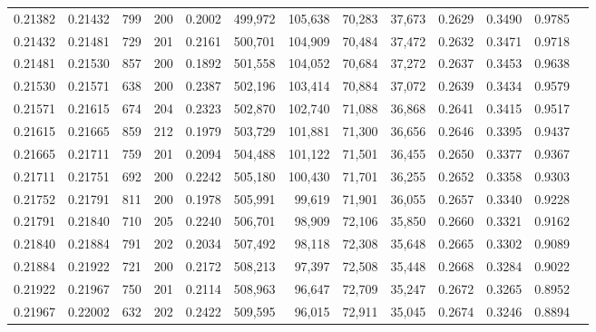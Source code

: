 \begin{tabular}{rrrrrrrrrrrrr}
0.21382 & 0.21432 &   799 & 200 &                                     0.2002 & 499,972 & 105,638 &  70,283 &  37,673 & 0.2629 & 0.3490 & 0.9785 \\
0.21432 & 0.21481 &   729 & 201 &                                     0.2161 & 500,701 & 104,909 &  70,484 &  37,472 & 0.2632 & 0.3471 & 0.9718 \\
0.21481 & 0.21530 &   857 & 200 &                                     0.1892 & 501,558 & 104,052 &  70,684 &  37,272 & 0.2637 & 0.3453 & 0.9638 \\
0.21530 & 0.21571 &   638 & 200 &                                     0.2387 & 502,196 & 103,414 &  70,884 &  37,072 & 0.2639 & 0.3434 & 0.9579 \\
0.21571 & 0.21615 &   674 & 204 &                                     0.2323 & 502,870 & 102,740 &  71,088 &  36,868 & 0.2641 & 0.3415 & 0.9517 \\
0.21615 & 0.21665 &   859 & 212 &                                     0.1979 & 503,729 & 101,881 &  71,300 &  36,656 & 0.2646 & 0.3395 & 0.9437 \\
0.21665 & 0.21711 &   759 & 201 &                                     0.2094 & 504,488 & 101,122 &  71,501 &  36,455 & 0.2650 & 0.3377 & 0.9367 \\
0.21711 & 0.21751 &   692 & 200 &                                     0.2242 & 505,180 & 100,430 &  71,701 &  36,255 & 0.2652 & 0.3358 & 0.9303 \\
0.21752 & 0.21791 &   811 & 200 &                                     0.1978 & 505,991 &  99,619 &  71,901 &  36,055 & 0.2657 & 0.3340 & 0.9228 \\
0.21791 & 0.21840 &   710 & 205 &                                     0.2240 & 506,701 &  98,909 &  72,106 &  35,850 & 0.2660 & 0.3321 & 0.9162 \\
0.21840 & 0.21884 &   791 & 202 &                                     0.2034 & 507,492 &  98,118 &  72,308 &  35,648 & 0.2665 & 0.3302 & 0.9089 \\
0.21884 & 0.21922 &   721 & 200 &                                     0.2172 & 508,213 &  97,397 &  72,508 &  35,448 & 0.2668 & 0.3284 & 0.9022 \\
0.21922 & 0.21967 &   750 & 201 &                                     0.2114 & 508,963 &  96,647 &  72,709 &  35,247 & 0.2672 & 0.3265 & 0.8952 \\
0.21967 & 0.22002 &   632 & 202 &                                     0.2422 & 509,595 &  96,015 &  72,911 &  35,045 & 0.2674 & 0.3246 & 0.8894 \\

\end{tabular}
